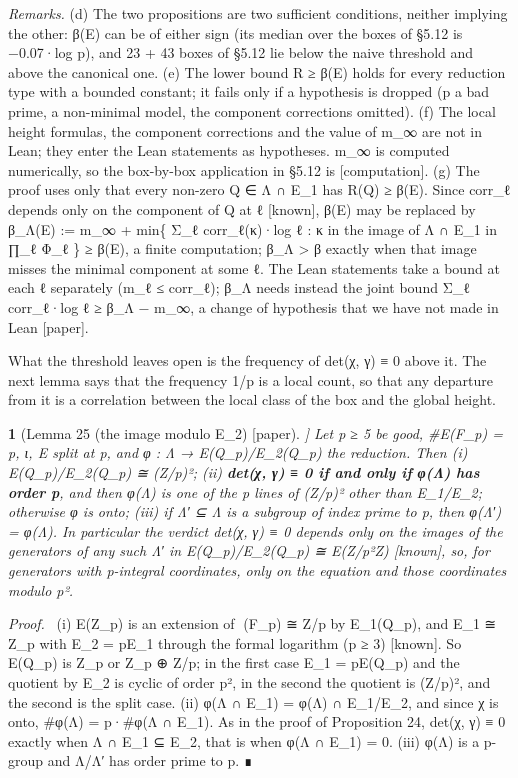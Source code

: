 \documentclass[11pt,a4paper]{article}
\theoremstyle{named}
\newtheorem*{namedthm}{}
\newenvironment{mdproof}[1][Proof]{\par\medskip\noindent\textit{#1.}\ }{\par\medskip}
\begin{document}
\textit{Remarks.} (d) The two propositions are two sufficient conditions, neither implying the other: β(E) can be of either sign (its median over the boxes of §5.12 is −0.07·log p), and 23 + 43 boxes of §5.12 lie below the naive threshold and above the canonical one. (e) The lower bound R ≥ β(E) holds for every reduction type with a bounded constant; it fails only if a hypothesis is dropped (p a bad prime, a non-minimal model, the component corrections omitted). (f) The local height formulas, the component corrections and the value of m\_∞ are not in Lean; they enter the Lean statements as hypotheses. m\_∞ is computed numerically, so the box-by-box application in §5.12 is [computation]. (g) The proof uses only that every non-zero Q ∈ Λ ∩ E\_1 has R(Q) ≥ β(E). Since corr\_ℓ depends only on the component of Q at ℓ [known], β(E) may be replaced by β\_Λ(E) := m\_∞ + min\{ Σ\_ℓ corr\_ℓ(κ)·log ℓ : κ in the image of Λ ∩ E\_1 in ∏\_ℓ Φ\_ℓ \} ≥ β(E), a finite computation; β\_Λ \textgreater{} β exactly when that image misses the minimal component at some ℓ. The Lean statements take a bound at each ℓ separately (m\_ℓ ≤ corr\_ℓ); β\_Λ needs instead the joint bound Σ\_ℓ corr\_ℓ·log ℓ ≥ β\_Λ − m\_∞, a change of hypothesis that we have not made in Lean [paper].

What the threshold leaves open is the frequency of det(χ, γ) ≡ 0 above it. The next lemma says that the frequency 1/p is a local count, so that any departure from it is a correlation between the local class of the box and the global height.

\begin{namedthm}[Lemma 25 (the image modulo E\_2) [paper]]
Let p ≥ 5 be good, \#E(F\_p) = p, ι, E split at p, and φ : Λ → E(Q\_p)/E\_2(Q\_p) the reduction. Then
(i) E(Q\_p)/E\_2(Q\_p) ≅ (Z/p)²;
(ii) \textbf{det(χ, γ) ≡ 0 if and only if φ(Λ) has order p}, and then φ(Λ) is one of the p lines of (Z/p)² other than E\_1/E\_2; otherwise φ is onto;
(iii) if Λ′ ⊆ Λ is a subgroup of index prime to p, then φ(Λ′) = φ(Λ). In particular the verdict det(χ, γ) ≡ 0 depends only on the images of the generators of any such Λ′ in E(Q\_p)/E\_2(Q\_p) ≅ E(Z/p²Z) [known], so, for generators with p-integral coordinates, only on the equation and those coordinates modulo p².
\end{namedthm}

\begin{mdproof}[Proof]
(i) E(Z\_p) is an extension of (F\_p) ≅ Z/p by E\_1(Q\_p), and E\_1 ≅ Z\_p with E\_2 = pE\_1 through the formal logarithm (p ≥ 3) [known]. So E(Q\_p) is Z\_p or Z\_p ⊕ Z/p; in the first case E\_1 = pE(Q\_p) and the quotient by E\_2 is cyclic of order p², in the second the quotient is (Z/p)², and the second is the split case. (ii) φ(Λ ∩ E\_1) = φ(Λ) ∩ E\_1/E\_2, and since χ is onto, \#φ(Λ) = p·\#φ(Λ ∩ E\_1). As in the proof of Proposition 24, det(χ, γ) ≡ 0 exactly when Λ ∩ E\_1 ⊆ E\_2, that is when φ(Λ ∩ E\_1) = 0. (iii) φ(Λ) is a p-group and Λ/Λ′ has order prime to p. ∎
\end{mdproof}
\end{document}
